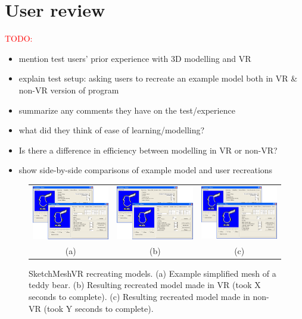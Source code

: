 \section{User review}

\textcolor{red}{TODO:}
\begin{itemize}
\item mention test users' prior experience with 3D modelling and VR
\item explain test setup: asking users to recreate an example model both in VR \& non-VR version of program
\item summarize any comments they have on the test/experience
\item what did they think of ease of learning/modelling?
\item Is there a difference in efficiency between modelling in VR or non-VR?
\item show side-by-side comparisons of example model and user recreations
\end{itemize}


\begin{figure}[!h]
    \centering
    \setlength{\tabcolsep}{0.0130\linewidth}
    \begin{tabular}{@{}ccc@{}}
    \includegraphics[width=0.3\linewidth]{figures/voldiff_ui}&
  	\includegraphics[width=0.3\linewidth]{figures/voldiff_ui}&
  	\includegraphics[width=0.3\linewidth]{figures/voldiff_ui}\\

    (a)&(b)&(c)\\
    \end{tabular}
    \caption[SketchMeshVR teddy model]{SketchMeshVR recreating models.
    	  \textup{(a)} Example simplified mesh of a teddy bear.
	  \textup{(b)} Resulting recreated model made in VR  (took X seconds to complete).
	  \textup{(c)} Resulting recreated model made in non-VR (took Y seconds to complete).
      \label{fig:recreate_teddy}}
\end{figure}


